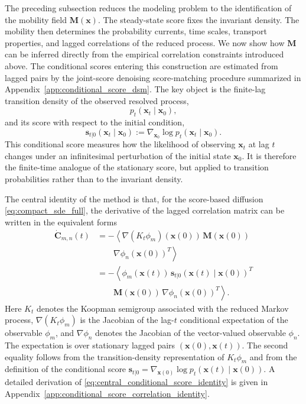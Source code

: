 \documentclass[11pt,twoside,fleqn]{article}
\begin{document}
The preceding subsection reduces the modeling problem to the identification of the mobility field $\bm{M}(\bm{x})$. The steady-state score fixes the invariant density. The mobility then determines the probability currents, time scales, transport properties, and lagged correlations of the reduced process. We now show how $\bm{M}$ can be inferred directly from the empirical correlation constraints introduced above. The conditional scores entering this construction are estimated from lagged pairs by the joint-score denoising score-matching procedure summarized in Appendix~\ref{app:conditional_score_dsm}.
The key object is the finite-lag transition density of the observed resolved process,
\begin{equation}
    p_t(\bm{x}_t\mid \bm{x}_0),
\end{equation}
and its score with respect to the initial condition,
\begin{equation}
    \bm{s}_{t|0}(\bm{x}_t\mid \bm{x}_0)
    :=
    \nabla_{\bm{x}_0}
    \log p_t(\bm{x}_t\mid \bm{x}_0).
    \label{eq:conditional_score_method_section}
\end{equation}
This conditional score measures how the likelihood of observing $\bm{x}_t$ at lag $t$ changes under an infinitesimal perturbation of the initial state $\bm{x}_0$. It is therefore the finite-time analogue of the stationary score, but applied to transition probabilities rather than to the invariant density.

The central identity of the method is that, for the score-based diffusion
\eqref{eq:compact_sde_full}, the derivative of the lagged correlation matrix can
be written in the equivalent forms
\begin{equation}
\begin{aligned}
    \dot{\bm{C}}_{m,n}(t)
    &=
    -
    \left\langle
        \nabla (K_t\phi_m)(\bm{x}(0))\,
        \bm{M}(\bm{x}(0))
    \right. \\
    &\qquad\left.
        \nabla\phi_n(\bm{x}(0))^T
    \right\rangle
    \\
    &=
    -
    \left\langle
        \phi_m(\bm{x}(t))\,
        \bm{s}_{t|0}(\bm{x}(t)\mid \bm{x}(0))^T
    \right. \\
    &\qquad\left.
        \bm{M}(\bm{x}(0))\,
        \nabla\phi_n(\bm{x}(0))^T
    \right\rangle .
\end{aligned}
    \label{eq:central_conditional_score_identity}
\end{equation}
Here \(K_t\) denotes the Koopman semigroup associated with the reduced
Markov process, \(\nabla(K_t\phi_m)\) is the Jacobian of the lag-\(t\)
conditional expectation of the observable \(\phi_m\), and \(\nabla\phi_n\)
denotes the Jacobian of the vector-valued observable \(\phi_n\). The
expectation is over stationary lagged pairs \((\bm{x}(0),\bm{x}(t))\).
The second equality follows from the transition-density representation of
\(K_t\phi_m\) and from the definition of the conditional score
\(\bm{s}_{t|0}=\nabla_{\bm{x}(0)}\log p_t(\bm{x}(t)\mid\bm{x}(0))\). A
detailed derivation of \eqref{eq:central_conditional_score_identity} is given in
Appendix~\ref{app:conditional_score_correlation_identity}.
\end{document}

